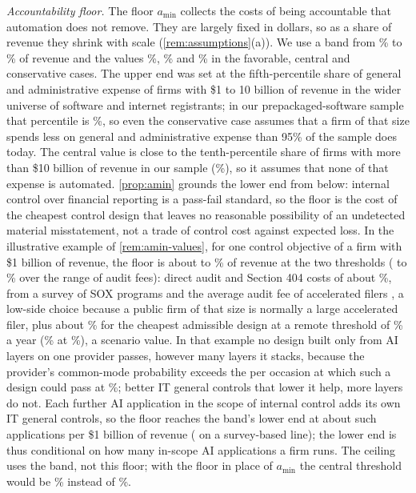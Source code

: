 \emph{Accountability floor.} The floor $a_{\min}$ collects the costs of being accountable that automation does not remove. They are largely fixed in dollars, so as a share of revenue they shrink with scale (\autoref{rem:assumptions}(a)). We use a band from \AminLo\% to \AminHi\% of revenue and the values \CeilAminPctFav\%, \CeilAminPctCen\% and \CeilAminPctCons\% in the favorable, central and conservative cases. The upper end was set at the fifth-percentile share of general and administrative expense of firms with \$1 to 10 billion of revenue in the wider universe of software and internet registrants; in our prepackaged-software sample that percentile is \AminGaCoreFive\%, so even the conservative case assumes that a firm of that size spends less on general and administrative expense than 95\% of the sample does today. The central value is close to the tenth-percentile share of firms with more than \$10 billion of revenue in our sample (\AminGaCoreTen\%), so it assumes that none of that expense is automated. \autoref{prop:amin} grounds the lower end from below: internal control over financial reporting is a pass-fail standard, so the floor is the cost of the cheapest control design that leaves no reasonable possibility of an undetected material misstatement, not a trade of control cost against expected loss. In the illustrative example of \autoref{rem:amin-values}, for one control objective of a firm with \$1 billion of revenue, the floor is about \AminFloor{} to \AminFloorOne\% of revenue at the two thresholds (\AminFloorLo{} to \AminFloorHi\% over the range of audit fees): direct audit and Section 404 costs of about \AminDirect\%, from a survey of SOX programs and the average audit fee of accelerated filers \citep{kpmg2025sox,auditanalytics2023fees}, a low-side choice because a public firm of that size is normally a large accelerated filer, plus about \AminBest\% for the cheapest admissible design at a remote threshold of \AminEpsCen\% a year (\AminBestOne\% at \AminEpsSens\%), a scenario value. In that example no design built only from AI layers on one provider passes, however many layers it stacks, because the provider's common-mode probability exceeds the \AminPbarFive{} per occasion at which such a design could pass at \AminEpsCen\%; better IT general controls that lower it help, more layers do not. Each further AI application in the scope of internal control adds its own IT general controls, so the floor reaches the band's lower end at about \ItgcApps{} such applications per \$1 billion of revenue (\ItgcAppsRef{} on a survey-based line); the lower end is thus conditional on how many in-scope AI applications a firm runs. The ceiling uses the band, not this floor; with the floor in place of $a_{\min}$ the central threshold would be \GstarAminFloor\% instead of \GstarCenOne\%.

